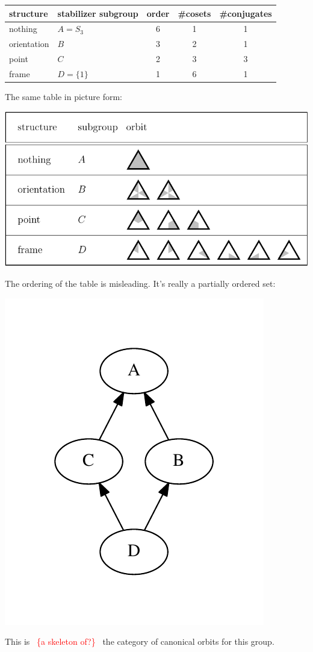 \documentclass[11pt,oneside]{article}
\newcommand{\todo}[1]{\ \textcolor{red}{\{#1\}}\ }
\begin{document}
\begin{samepage}
\begin{center}
\begin{tabular}{ |l|l|c|c|c| }
\hline
structure & stabilizer subgroup & order & \#cosets & \#conjugates \\
\hline
\hline
nothing & $A=S_3$ &       6        &  1      &   1         \\
\hline
orientation &$B$ &       3        &  2      &   1         \\
\hline
point & $C$ &       2        &  3      &   3         \\
\hline
frame & $D=\{1\}$ &       1        &  6      &   1         \\
\hline
\end{tabular}
\end{center}
\end{samepage}

The same table in picture form:
\begin{center}
\includegraphics[]{pic-triangle-structures.pdf} 
\end{center}

The ordering of the table is misleading.
It's really a partially ordered set:
\begin{center}
\includegraphics[width=0.3\columnwidth]{subgroups_s3.pdf} 
\end{center}
This is \todo{a skeleton of?} the category of canonical orbits
for this group.
\end{document}
